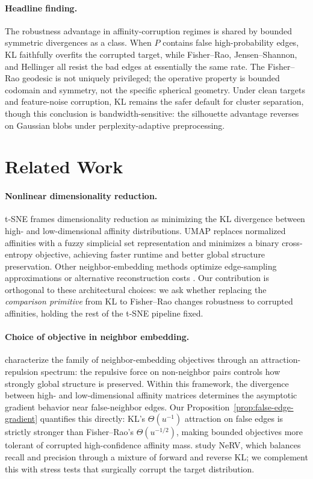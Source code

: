 \documentclass[11pt]{article}
\begin{document}
\paragraph{Headline finding.}
The robustness advantage in affinity-corruption regimes is shared by bounded symmetric
divergences as a class. When $P$ contains false high-probability edges, KL faithfully overfits
the corrupted target, while Fisher--Rao, Jensen--Shannon, and Hellinger all resist the bad
edges at essentially the same rate. The Fisher--Rao geodesic is not uniquely privileged; the
operative property is bounded codomain and symmetry, not the specific spherical geometry.
Under clean targets and feature-noise corruption, KL remains the safer default for cluster
separation, though this conclusion is bandwidth-sensitive: the silhouette advantage reverses on
Gaussian blobs under perplexity-adaptive preprocessing.

\section{Related Work}

\paragraph{Nonlinear dimensionality reduction.}
t-SNE \citep{maaten2008visualizing} frames dimensionality reduction as minimizing the KL
divergence between high- and low-dimensional affinity distributions.
UMAP \citep{mcinnes2018umap} replaces normalized affinities with a fuzzy simplicial set
representation and minimizes a binary cross-entropy objective, achieving faster runtime and
better global structure preservation.
Other neighbor-embedding methods optimize edge-sampling approximations or alternative
reconstruction costs \citep{venna2010information}.
Our contribution is orthogonal to these architectural choices: we ask whether replacing the
\emph{comparison primitive} from KL to Fisher--Rao changes robustness to corrupted affinities,
holding the rest of the t-SNE pipeline fixed.

\paragraph{Choice of objective in neighbor embedding.}
\citet{bohm2022attraction} characterize the family of neighbor-embedding objectives through an
attraction-repulsion spectrum: the repulsive force on non-neighbor pairs controls how strongly
global structure is preserved.
Within this framework, the divergence between high- and low-dimensional affinity matrices
determines the asymptotic gradient behavior near false-neighbor edges.
Our Proposition~\ref{prop:false-edge-gradient} quantifies this directly: KL's
$\Theta(u^{-1})$ attraction on false edges is strictly stronger than Fisher--Rao's
$\Theta(u^{-1/2})$, making bounded objectives more tolerant of corrupted high-confidence
affinity mass.
\citet{venna2010information} study NeRV, which balances recall and precision through a
mixture of forward and reverse KL; we complement this with stress tests that surgically
corrupt the target distribution.
\end{document}
